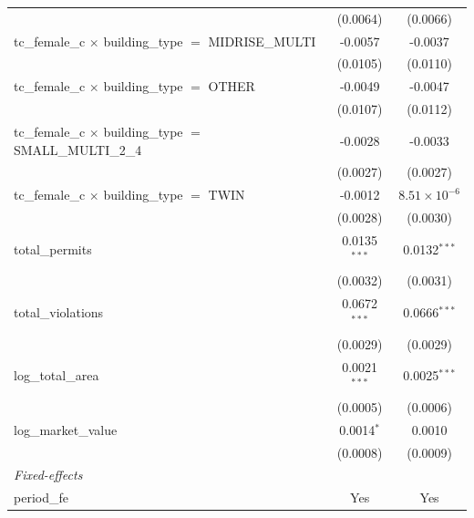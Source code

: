 \begin{tabular}{lcc}
                                                                       & (0.0064)       & (0.0066)\\   
   tc\_female\_c $\times$ building\_type $=$ MIDRISE\_MULTI            & -0.0057        & -0.0037\\   
                                                                       & (0.0105)       & (0.0110)\\   
   tc\_female\_c $\times$ building\_type $=$ OTHER                     & -0.0049        & -0.0047\\   
                                                                       & (0.0107)       & (0.0112)\\   
   tc\_female\_c $\times$ building\_type $=$ SMALL\_MULTI\_2\_4        & -0.0028        & -0.0033\\   
                                                                       & (0.0027)       & (0.0027)\\   
   tc\_female\_c $\times$ building\_type $=$ TWIN                      & -0.0012        & $8.51\times 10^{-6}$\\    
                                                                       & (0.0028)       & (0.0030)\\   
   total\_permits                                                      & 0.0135$^{***}$ & 0.0132$^{***}$\\   
                                                                       & (0.0032)       & (0.0031)\\   
   total\_violations                                                   & 0.0672$^{***}$ & 0.0666$^{***}$\\   
                                                                       & (0.0029)       & (0.0029)\\   
   log\_total\_area                                                    & 0.0021$^{***}$ & 0.0025$^{***}$\\   
                                                                       & (0.0005)       & (0.0006)\\   
   log\_market\_value                                                  & 0.0014$^{*}$   & 0.0010\\   
                                                                       & (0.0008)       & (0.0009)\\   
   \midrule
   \emph{Fixed-effects}\\
   period\_fe                                                          & Yes            & Yes\\  

\end{tabular}
